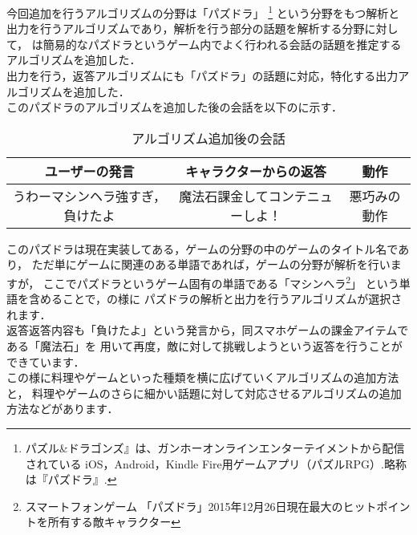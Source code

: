 今回追加を行うアルゴリズムの分野は「パズドラ」
\footnote{パズル\&ドラゴンズ』は、ガンホーオンラインエンターテイメントから配信されている
iOS，Android，Kindle Fire用ゲームアプリ（パズルRPG）.略称は『パズドラ』.}
という分野をもつ解析と出力を行うアルゴリズムであり，解析を行う部分の話題を解析する分野に対して，
は簡易的なパズドラというゲーム内でよく行われる会話の話題を推定するアルゴリズムを追加した．\\

出力を行う，返答アルゴリズムにも「パズドラ」の話題に対応，特化する出力アルゴリズムを追加した．\\

このパズドラのアルゴリズムを追加した後の会話を以下のに示す．\\

\begin{table}[tbh]
	\caption{アルゴリズム追加後の会話} \label{tab:afterChat}
	\begin{center}
		\begin{tabular}[htb]{c|c|c}
		\hline
		ユーザーの発言 & キャラクターからの返答 & 動作 \\
		\hline
		うわーマシンヘラ強すぎ，負けたよ & 魔法石課金してコンテニューしよ！ & 悪巧みの動作 \\
		\hline
		\end{tabular}
	\end{center}
\end{table}

このパズドラは現在実装してある，ゲームの分野の中のゲームのタイトル名であり，
ただ単にゲームに関連のある単語であれば，ゲームの分野が解析を行いますが，
ここでパズドラというゲーム固有の単語である「マシンへラ\footnote{スマートフォンゲーム
「パズドラ」2015年12月26日現在最大のヒットポイントを所有する敵キャラクター}」
という単語を含めることで，の様に
パズドラの解析と出力を行うアルゴリズムが選択されます．
\\
返答返答内容も「負けたよ」という発言から，同スマホゲームの課金アイテムである「魔法石」を
用いて再度，敵に対して挑戦しようという返答を行うことができています．
\\
この様に料理やゲームといった種類を横に広げていくアルゴリズムの追加方法と，
料理やゲームのさらに細かい話題に対して対応させるアルゴリズムの追加方法などがあります．

